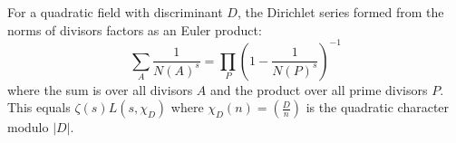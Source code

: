 For a quadratic field with discriminant $D$, the Dirichlet series formed from the norms of divisors factors as an Euler product:
$$\sum_A \frac{1}{N(A)^s} = \prod_P \left(1 - \frac{1}{N(P)^s}\right)^{-1}$$
where the sum is over all divisors $A$ and the product over all prime divisors $P$. This equals $\zeta(s) L(s, \chi_D)$ where $\chi_D(n) = \left(\frac{D}{n}\right)$ is the quadratic character modulo $|D|$.
